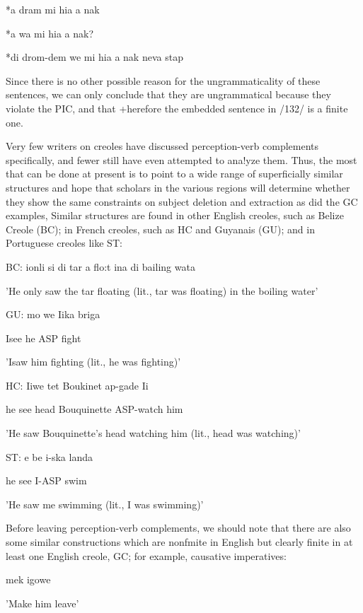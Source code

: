\ea\label{ex:146}
 *a dram mi hia a nak
\glt
\z

\ea\label{ex:147}
 *a wa mi hia a nak?
\glt
\z

\ea\label{ex:148}
 *di drom-dem we mi hia a nak neva stap
\glt
\z

Since there is no other possible reason for the ungrammaticality of these sentences, we can only conclude that they are ungrammatical because they violate the PIC, and that +herefore the embedded sentence in /132/ is a finite one.


Very few writers on creoles have discussed perception-verb com\-plements specifically, and fewer still have even attempted to ana!yze them. Thus, the most that can be done at present is to point to a wide range of superficially similar structures and hope that scholars in the various regions will determine whether they show the same constraints on subject deletion and extraction as did the GC examples, Similar structures are found in other English creoles, such as Belize Creole (BC); in French creoles, such as HC and Guyanais (GU); and in Portu\-guese creoles like ST:

\ea\label{ex:149}
 BC: ionli si di tar a flo:t ina di bailing wata
\glt
\z

'He only saw the tar floating (lit., tar was floating) in the boiling water'

\ea\label{ex:150}
 GU: mo we Iika briga
\glt
\z

Isee he ASP fight

'Isaw him fighting (lit., he was fighting)'

\ea\label{ex:151}
 HC: Iiwe tet Boukinet ap-gade Ii
\glt
\z

he see head Bouquinette ASP-watch him

'He saw Bouquinette's head watching him (lit., head was watching)'

\ea\label{ex:152}
 ST: e be i-ska landa
\glt
\z

he see I-ASP swim

'He saw me swimming (lit., I was swimming)'

Before leaving perception-verb complements, we should note that there are also some similar constructions which are nonfmite in English but clearly finite in at least one English creole, GC; for example, causative imperatives:

\ea\label{ex:153}
 mek igowe
\glt
\z

'Make him leave'

